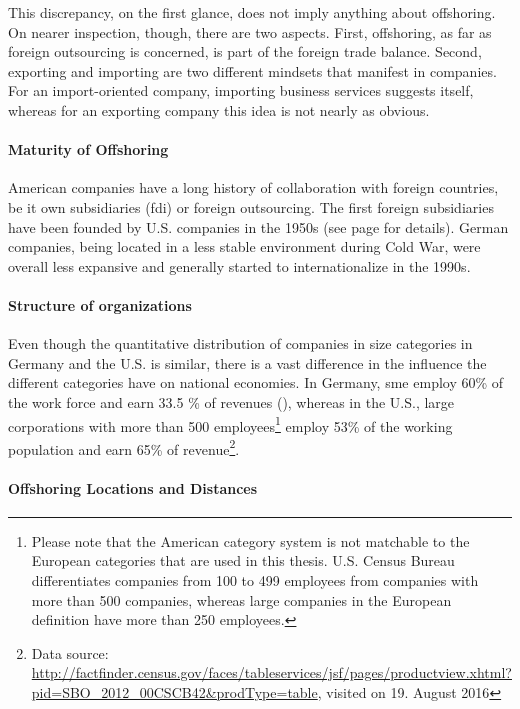 This discrepancy, on the first glance, does not imply anything about offshoring. On nearer inspection, though, there are two aspects. First, offshoring, as far as foreign outsourcing is concerned, is part of the foreign trade balance. Second, exporting and importing are two different mindsets that manifest in companies. For an import-oriented company, importing business services suggests itself, whereas for an exporting company this idea is not nearly as obvious.

\paragraph{Maturity of Offshoring}
American companies have a long history of collaboration with foreign countries, be it own subsidiaries (\gls{fdi}) or foreign outsourcing. The first foreign subsidiaries have been founded by U.S. companies in the 1950s (see page \pageref{par:USHistory} for details). German companies, being located in a less stable environment during Cold War, were overall less expansive and generally started to internationalize in the 1990s.

\paragraph{Structure of organizations}
Even though the quantitative distribution of companies in size categories in Germany and the U.S. is similar, there is a vast difference in the influence the different categories have on national economies. In Germany, \gls{sme} employ 60\% of the work force and earn 33.5 \% of revenues (\cite{Sollner.2014}), whereas in the U.S., large corporations with more than 500 employees\footnote{Please note that the American category system is not matchable to the European categories that are used in this thesis. U.S. Census Bureau differentiates companies from 100 to 499 employees from companies with more than 500 companies, whereas large companies in the European definition have more than 250 employees.} employ 53\% of the working population and earn 65\% of revenue\footnote{{Data source: \url{http://factfinder.census.gov/faces/tableservices/jsf/pages/productview.xhtml?pid=SBO_2012_00CSCB42&prodType=table}, visited on 19. August 2016}}.


\paragraph{Offshoring Locations and Distances}

